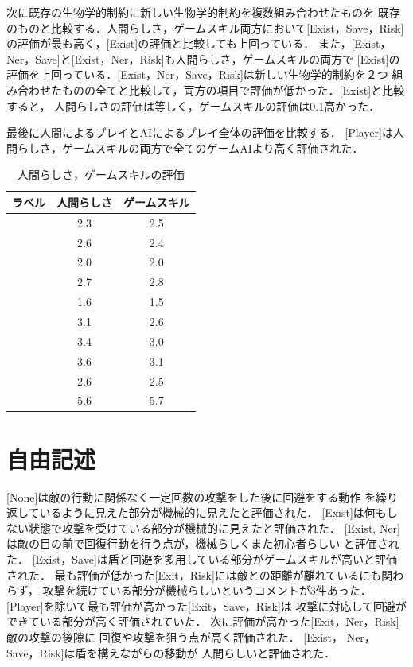 \documentclass[a4paper,12pt,oneside,openany,titlepage]{jreport}
\begin{document}
 次に既存の生物学的制約に新しい生物学的制約を複数組み合わせたものを
 既存のものと比較する．人間らしさ，ゲームスキル両方において[Exist，Save，Risk]
 の評価が最も高く，[Exist]の評価と比較しても上回っている．
 また，[Exist，Ner，Save]と[Exist，Ner，Risk]も人間らしさ，ゲームスキルの両方で
 [Exist]の評価を上回っている．[Exist，Ner，Save，Risk]は新しい生物学的制約を２つ
 組み合わせたものの全てと比較して，両方の項目で評価が低かった．[Exist]と比較すると，
 人間らしさの評価は等しく，ゲームスキルの評価は0.1高かった．
 
 最後に人間によるプレイとAIによるプレイ全体の評価を比較する．
 [Player]は人間らしさ，ゲームスキルの両方で全てのゲームAIより高く評価された．
 
 
 \begin{table}[!ht]
   \centering
   \caption{人間らしさ，ゲームスキルの評価}
   \label{kekka}
   \begin{tabular}{c|c|c}
   \hline
       ラベル & 人間らしさ & ゲームスキル \\ \hline
       [None] & 2.3 & 2.5 \\ \hline
       [Exist] & 2.6 & 2.4 \\ \hline
       [Exist,Ner] & 2.0 & 2.0 \\ \hline
       [Exist,Save] & 2.7 & 2.8 \\ \hline
       [Exist,Risk] & 1.6 & 1.5 \\ \hline
       [Exist,Ner,Save] & 3.1 & 2.6 \\ \hline
       [Exist,Ner,Risk] & 3.4 & 3.0 \\ \hline
       [Exist,Save,Risk] & 3.6 & 3.1 \\ \hline
       [Exist,Ner,Save,Risk] & 2.6 & 2.5 \\ \hline
       [Player] & 5.6 & 5.7 \\ \hline
   \end{tabular}
 \end{table}
 
 \section{自由記述}
 [None]は敵の行動に関係なく一定回数の攻撃をした後に回避をする動作
 を繰り返しているように見えた部分が機械的に見えたと評価された．
 [Exist]は何もしない状態で攻撃を受けている部分が機械的に見えたと評価された．
 [Exist, Ner]は敵の目の前で回復行動を行う点が，機械らしくまた初心者らしい
 と評価された．
 [Exist，Save]は盾と回避を多用している部分がゲームスキルが高いと評価された．
 最も評価が低かった[Exit，Risk]には敵との距離が離れているにも関わらず，
 攻撃を続けている部分が機械らしいというコメントが3件あった．
 [Player]を除いて最も評価が高かった[Exit，Save，Risk]は
 攻撃に対応して回避ができている部分が高く評価されていた．
 次に評価が高かった[Exit，Ner，Risk]敵の攻撃の後隙に
 回復や攻撃を狙う点が高く評価された．
 [Exist， Ner，Save，Risk]は盾を構えながらの移動が
 人間らしいと評価された．
 
\end{document}
